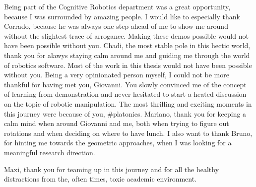 Being part of the Cognitive Robotics department was a great opportunity, because
I was surrounded by amazing people. I would like to especially thank Corrado,
because he was always one step ahead of me to show me around without the
slightest trace of arrogance. Making these demos possible would not have been
possible without you. Chadi, the most stable pole in this hectic world, thank
you for alawys staying calm around me and guiding me through the world of
robotics software. Most of the work in this thesis would not have been possible
without you. Being a very opinionated person myself, I could not be more
thankful for having met you, Giovanni. You slowly convinced me of the concept of
learning-from-demonstration and never hesitated to start a heated discussion on
the topic of robotic manipulation. The most thrilling and exciting moments in
this journey were because of you, #platonics. Mariano, thank you for keeping a
calm mind when around Giovanni and me, both when trying to figure out rotations
and when deciding on where to have lunch. I also want to thank Bruno, for
hinting me towards the geometric approaches, when I was looking for a meaningful
research direction.


Maxi, thank you for teaming up in this journey and for all the
healthy distractions from the, often times, toxic academic environment.


